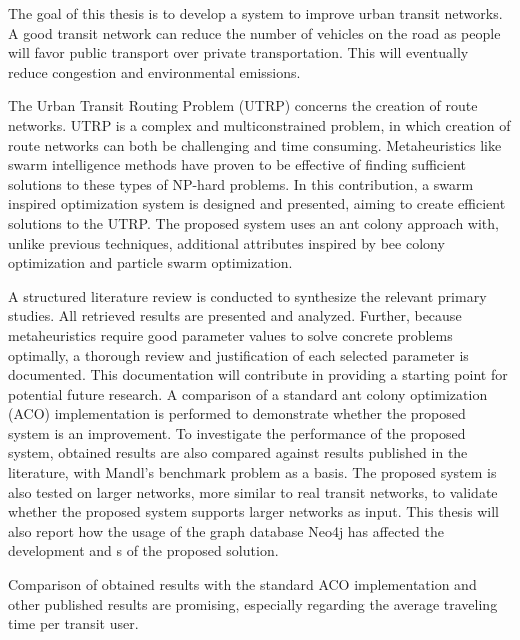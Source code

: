 

The goal of this thesis is to develop a system to improve urban transit networks. A good transit network can reduce the number of vehicles on the road as people will favor public transport over private transportation. This will eventually reduce congestion and environmental emissions.%

The Urban Transit Routing Problem (UTRP) concerns the creation of route networks. UTRP is a complex and multiconstrained problem, in which creation of route networks can both be challenging and time consuming. Metaheuristics like swarm intelligence methods have proven to be effective of finding sufficient solutions to these types of NP-hard problems. In this contribution, a swarm inspired optimization system is designed and presented, aiming to create efficient solutions to the UTRP. The proposed system uses an ant colony approach with, unlike previous techniques, additional attributes inspired by bee colony optimization and particle swarm optimization. 

A structured literature review is conducted to synthesize the relevant primary studies. All retrieved results are presented and analyzed. Further, because metaheuristics require good parameter values to solve concrete problems optimally, a thorough review and justification of each selected parameter is documented. This documentation will contribute in providing a starting point for potential future research. A comparison of a standard ant colony optimization (ACO) implementation is performed to demonstrate whether the proposed system is an improvement. To investigate the performance of the proposed system, obtained results are also compared against results published in the literature, with Mandl's benchmark problem as a basis.  The proposed system is also tested on larger networks, more similar to real transit networks, to validate whether the proposed system supports larger networks as input. This thesis will also report how the usage of the graph database Neo4j has affected the development and s of the proposed solution.  

Comparison of obtained results with the standard ACO implementation and other published results are promising, especially regarding the average traveling time per transit user. 



